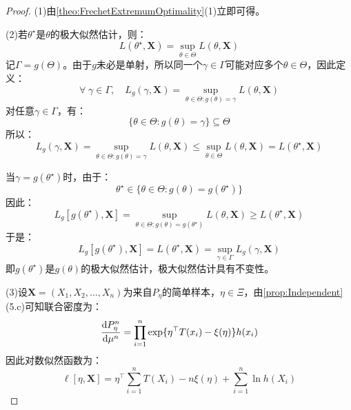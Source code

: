 \begin{proof}
	(1)由\cref{theo:FrechetExtremumOptimality}(1)立即可得。\par
	(2)若$\theta^{\star}$是$\theta$的极大似然估计，则：
	\begin{equation*}
		L(\theta^{\star},\mathbf{X})=\sup_{\theta\in\Theta}L(\theta,\mathbf{X})
	\end{equation*}
	记$\Gamma=g(\Theta)$。由于$g$未必是单射，所以同一个$\gamma\in\Gamma$可能对应多个$\theta\in\Theta$，因此定义：
	\begin{equation*}
		\forall\;\gamma\in\Gamma,\quad L_g(\gamma,\mathbf{X})=\sup_{\theta\in\Theta:g(\theta)=\gamma}L(\theta,\mathbf{X})
	\end{equation*}
	对任意$\gamma\in\Gamma$，有：
	\begin{equation*}
		\{\theta\in\Theta:g(\theta)=\gamma\}\subseteq \Theta
	\end{equation*}
	所以：
	\begin{equation*}
		L_g(\gamma,\mathbf{X})=\sup_{\theta\in\Theta:g(\theta)=\gamma}L(\theta,\mathbf{X})\leqslant\sup_{\theta\in\Theta}L(\theta,\mathbf{X})=L(\theta^{\star},\mathbf{X})
	\end{equation*}\par
	当$\gamma=g(\theta^{\star})$时，由于：
	\begin{equation*}
		\theta^{\star}\in\{\theta\in\Theta:g(\theta)=g(\theta^{\star})\}
	\end{equation*}
	因此：
	\begin{equation*}
		L_g[g(\theta^{\star}),\mathbf{X}]=\sup_{\theta\in\Theta:g(\theta)=g(\theta^{\star})}L(\theta,\mathbf{X})\geqslant L(\theta^{\star},\mathbf{X})
	\end{equation*}
	于是：
	\begin{equation*}
		L_g[g(\theta^{\star}),\mathbf{X}]=L(\theta^{\star},\mathbf{X})=\sup_{\gamma\in\Gamma}L_g(\gamma,\mathbf{X})
	\end{equation*}
	即$g(\theta^{\star})$是$g(\theta)$的极大似然估计，极大似然估计具有不变性。\par
	(3)设$\mathbf{X}=(X_1,X_2,\dots,X_n)$为来自$P_\eta$的简单样本，$\eta\in\Xi$，由\cref{prop:Independent}(5.c)可知联合密度为：
	\begin{equation*}
		\frac{\mathop{}\!\mathrm{d} P_\eta^n}{\mathop{}\!\mathrm{d}\mu^n}=\prod_{i=1}^{n}\exp\{\eta^{\top}T(x_i)-\xi(\eta)\}h(x_i)
	\end{equation*}
	因此对数似然函数为：
	\begin{equation*}
		\ell[\eta,\mathbf{X}]=\eta^{\top}\sum_{i=1}^{n}T(X_i)-n\xi(\eta)+\sum_{i=1}^{n}\ln h(X_i) 

\end{equation*}
\end{proof}
